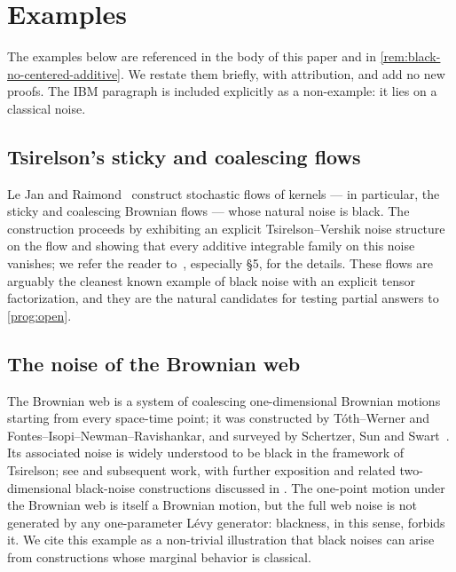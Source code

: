 \documentclass[11pt,reqno]{amsart}
\theoremstyle{plain}
\theoremstyle{definition}
\theoremstyle{remark}
\begin{document}
\section{Examples}\label{sec:examples}

The examples below are referenced in the body of this paper and in
\cref{rem:black-no-centered-additive}. We restate them briefly, with
attribution, and add no new proofs. The IBM paragraph is included
explicitly as a non-example: it lies on a classical noise.

\subsection{Tsirelson's sticky and coalescing flows}\label{sec:ex-sticky}

Le Jan and Raimond~\cite{LeJanRaimond2004} construct stochastic flows
of kernels --- in particular, the sticky and coalescing Brownian
flows --- whose natural noise is black. The construction proceeds by
exhibiting an explicit Tsirelson--Vershik noise structure on the
flow and showing that every additive integrable family on this noise
vanishes; we refer the reader to~\cite{LeJanRaimond2004}, especially
\S 5, for the details. These flows are arguably the cleanest known
example of black noise with an explicit tensor factorization, and
they are the natural candidates for testing partial answers to
\cref{prog:open}.

\subsection{The noise of the Brownian web}\label{sec:ex-bweb}

The Brownian web is a system of coalescing one-dimensional Brownian
motions starting from every space-time point; it was constructed by
T\'oth--Werner and Fontes--Isopi--Newman--Ravishankar, and surveyed
by Schertzer, Sun and Swart~\cite{SSS2017}. Its associated noise is
widely understood to be black in the framework of Tsirelson; see
\cite{Tsirelson2004} and subsequent work, with further exposition
and related two-dimensional black-noise constructions discussed in
\cite{SSS2017}. The one-point motion under the Brownian web is
itself a Brownian motion, but the full web noise is not generated
by any one-parameter L\'evy generator: blackness, in this sense,
forbids it. We cite this example as a non-trivial illustration that
black noises can arise from constructions whose marginal behavior
is classical.
\end{document}
